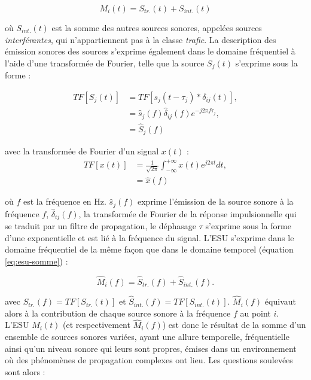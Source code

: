 \begin{equation}\label{eq:esu-somme}
M_i(t) = S_{tr.}(t)+S_{int.}(t)
\end{equation}

où $S_{int.}(t)$ est la somme des autres sources sonores, appelées sources \textit{interférantes}, qui n'appartiennent pas à la classe \textit{trafic}. 
La description des émission sonores des sources s'exprime également dans le domaine fréquentiel à l'aide d'une transformée de Fourier, telle que la source $S_j(t)$ s'exprime sous la forme : 

\begin{subequations}
\begin{align}
TF\left[S_j(t)\right] & = TF\left[s_j(t-\tau_j) \ast \delta_{ij}(t) \right],\\
 & = \hat{s}_j(f)\hat{\delta}_{ij}(f)e^{-j2\pi f \tau_j},\\
 & = \hat{S}_j(f)
\end{align}
\end{subequations}

avec la transformée de Fourier d'un signal $x(t)$ : 
\begin{subequations}
\begin{align}
TF\left[x(t)\right] & = \frac{1}{\sqrt{2\pi}}\int_{-\infty}^{+\infty} x(t)e^{j2\pi t} dt, \\
 & = \hat{x}(f)
\end{align}
\end{subequations}

où $f$ est la fréquence en Hz. $\hat{s}_j(f)$ exprime l'émission de la source sonore à la fréquence $f$, $\hat{\delta}_{ij}(f)$, la transformée de Fourier de la réponse impulsionnelle qui se traduit par un filtre de propagation, le déphasage $\tau$ s'exprime sous la forme d'une exponentielle et est lié à la fréquence du signal. L'ESU s'exprime dans le domaine fréquentiel de la même façon que dans le domaine temporel (équation \ref{eq:esu-somme}) : 

\begin{equation}
\hat{M}_i(f) = \hat{S}_{tr.}(f)+\hat{S}_{int.}(f).
\end{equation}

avec $\hat{S}_{tr.}(f) = TF\left[ S_{tr.}(t)\right]$ et $\hat{S}_{int.}(f) = TF\left[ S_{int.}(t)\right]$. $\hat{M}_i(f)$ équivaut alors à la contribution de chaque source sonore à la fréquence $f$ au point $i$.\\

L'ESU $M_i(t)$ (et respectivement $\hat{M}_i(f)$) est donc le résultat de la somme d'un ensemble de sources sonores variées, ayant une allure temporelle, fréquentielle ainsi qu'un niveau sonore qui leurs sont propres, émises dans un environnement où des phénomènes de propagation complexes ont lieu. Les questions soulevées sont alors :


